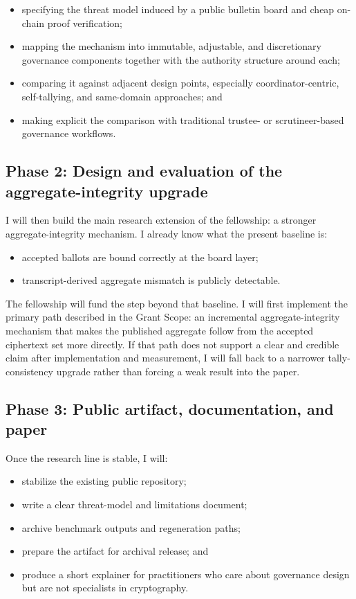 \documentclass[11pt]{article}
\begin{document}
\begin{itemize}[leftmargin=*]
\item specifying the threat model induced by a public bulletin board and cheap
      on-chain proof verification;
\item mapping the mechanism into immutable, adjustable, and discretionary
      governance components together with the authority structure around each;
\item comparing it against adjacent design points, especially
      coordinator-centric, self-tallying, and same-domain approaches; and
\item making explicit the comparison with traditional trustee- or
      scrutineer-based governance workflows.
\end{itemize}

\subsection{Phase 2: Design and evaluation of the aggregate-integrity upgrade}

I will then build the main research extension of the fellowship: a stronger
aggregate-integrity mechanism. I already know what the present baseline is:

\begin{itemize}[leftmargin=*]
\item accepted ballots are bound correctly at the board layer;
\item transcript-derived aggregate mismatch is publicly detectable.
\end{itemize}

The fellowship will fund the step beyond that baseline. I will first implement
the primary path described in the Grant Scope: an incremental
aggregate-integrity mechanism that makes the published aggregate follow from the
accepted ciphertext set more directly. If that path does not support a clear and
credible claim after implementation and measurement, I will fall back to a
narrower tally-consistency upgrade rather than forcing a weak result into the
paper.

\subsection{Phase 3: Public artifact, documentation, and paper}

Once the research line is stable, I will:

\begin{itemize}[leftmargin=*]
\item stabilize the existing public repository;
\item write a clear threat-model and limitations document;
\item archive benchmark outputs and regeneration paths;
\item prepare the artifact for archival release; and
\item produce a short explainer for practitioners who care about governance
      design but are not specialists in cryptography.
\end{itemize}
\end{document}
